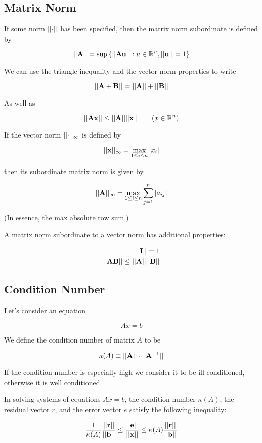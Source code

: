     \subsection{Matrix Norm}
    If some norm $\lvert \lvert \mathbf{\cdot} \rvert \rvert$ has been specified, then the matrix norm subordinate is defined by

    \[ \lvert \lvert \mathbf{A} \rvert \rvert = \sup \left\{ \lvert \lvert \mathbf{Au} \rvert \rvert : u \in \mathbb{R}^n, \lvert \lvert \mathbf{u} \rvert \rvert = 1 \right\} \]

    We can use the triangle inequality and the vector norm properties to write

    \[ \lvert \lvert \mathbf{A + B} \rvert \rvert = \lvert \lvert \mathbf{A} \rvert \rvert + \lvert \lvert \mathbf{B} \rvert \rvert \]

    As well as

    \[ \lvert \lvert \mathbf{Ax} \rvert \rvert \le \lvert \lvert \mathbf{A} \rvert \rvert \lvert \lvert \mathbf{x} \rvert \rvert \qquad (x \in \mathbb{R}^n) \]

    \begin{thm}
        If the vector norm $\lvert \lvert \mathbf{\cdot} \rvert \rvert_\infty$ is defined by

        \[ \lvert \lvert \mathbf{x} \rvert \rvert_\infty = \max_{1 \le i \le n} \left\lvert x_i \right\rvert \]

        then its subordinate matrix norm is given by

        \[ \lvert \lvert \mathbf{A} \rvert \rvert_\infty = \max_{1 \le i \le n} \sum_{j = 1}^n \left\lvert a_{ij} \right\rvert \]

        (In essence, the max absolute row sum.)
    \end{thm}

    A matrix norm subordinate to a vector norm has additional properties:

    \[
        \begin{aligned}
            \lvert \lvert \mathbf{I} \rvert \rvert = 1\\
            \lvert \lvert \mathbf{AB} \rvert \rvert \le \lvert \lvert \mathbf{A} \rvert \rvert \lvert \lvert \mathbf{B} \rvert \rvert
        \end{aligned}
    \]

    \subsection{Condition Number}
    Let's consider an equation

    \[ Ax = b \]

    We define the condition number of matrix $A$ to be

    \[ \kappa (A) \equiv \lvert \lvert \mathbf{A} \rvert \rvert \cdot \lvert \lvert \mathbf{A^{-1}} \rvert \rvert \]

    If the condition number is especially high we consider it to be ill-conditioned, otherwise it is well conditioned.

    \begin{thm}
        In solving systems of equations $Ax = b$, the condition number $\kappa (A)$, the residual vector $r$, and the
        error vector $e$ satisfy the following inequality:

        \[
            \frac{1}{\kappa (A)} \frac{\lvert \lvert \mathbf{r} \rvert \rvert}{\lvert \lvert \mathbf{b} \rvert \rvert} \le
            \frac{\lvert \lvert \mathbf{e} \rvert \rvert}{\lvert \lvert \mathbf{x} \rvert \rvert} \le
            \kappa (A) \frac{\lvert \lvert \mathbf{r} \rvert \rvert}{\lvert \lvert \mathbf{b} \rvert \rvert}
        \]
    \end{thm}

